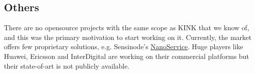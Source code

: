 \subsection{Others}
There are no opensource projects with the same scope as KINK that we know of, and this was the primary motivation to start working on it.
Currently, the market offers few proprietary solutions, e.g. Sensinode's \href{http://www.sensinode.com/EN/products/nanoservice.html}{NanoService}.  Huge players like Huawei, Ericsson and InterDigital are working on their commercial platforms but their state-of-art is not publicly available.